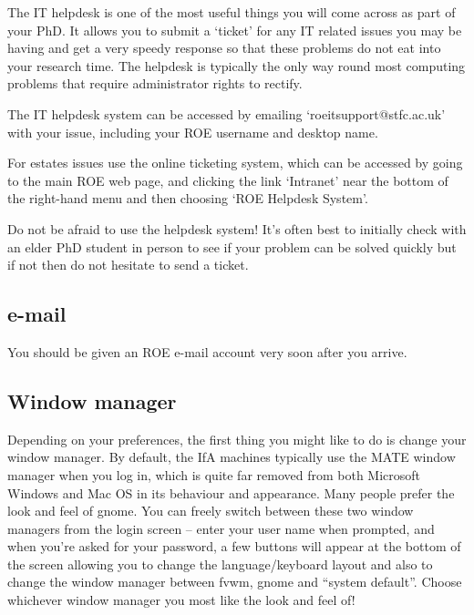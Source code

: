 The IT helpdesk is one of the most useful things you will come across as part of your PhD. 
It allows you to submit a `ticket' for any IT related
issues you may be having and get a very speedy response so that these problems do not eat into your research time. The helpdesk is typically the only way round most computing problems that require administrator rights to rectify. 

The IT helpdesk system can be accessed by emailing `roeitsupport@stfc.ac.uk' with your issue, including your ROE username and desktop name.

For estates issues use the online ticketing system, which can be accessed by going to the main ROE web page, and clicking the link `Intranet' near the bottom of the right-hand menu and then choosing `ROE Helpdesk System'.

Do not be afraid to use the helpdesk system! It's often best to initially check with an elder PhD student in person to see if your problem can be solved quickly but if not then do not hesitate to send a ticket. 


\subsection{e-mail}

You should be given an ROE e-mail account very soon after you arrive.

\subsection{Window manager}
Depending on your preferences, the first thing you might like to do is change your window manager. By default, the IfA machines typically use the {\sc MATE} window manager when you log in, which is quite far removed from both Microsoft Windows and Mac OS in its behaviour and appearance. Many people prefer the look and feel of {\sc gnome}. You can freely switch between these two window managers from the login screen -- enter your user name when prompted, and when you're asked for your password, a few buttons will appear at the bottom of the screen allowing you to change the language/keyboard layout and also to change the window manager between {\sc fvwm}, {\sc gnome} and ``{\sc system default}''. Choose whichever window manager you most like the look and feel of!

